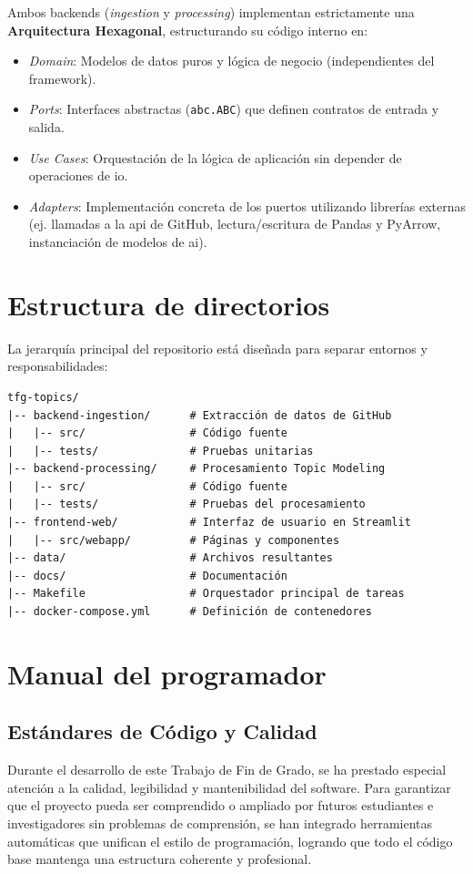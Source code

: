 Ambos backends (\textit{ingestion} y \textit{processing}) implementan
estrictamente una \textbf{Arquitectura Hexagonal}, estructurando su código
interno en:
\begin{itemize}
    \item \textit{Domain}: Modelos de datos puros y lógica de negocio (independientes del framework).
    \item \textit{Ports}: Interfaces abstractas (\texttt{abc.ABC}) que definen contratos de entrada y salida.
    \item \textit{Use Cases}: Orquestación de la lógica de aplicación sin depender de operaciones de \acrshort{io}.
    \item \textit{Adapters}: Implementación concreta de los puertos utilizando librerías externas (ej. llamadas a la \acrshort{api} de GitHub, lectura/escritura de Pandas y PyArrow, instanciación de modelos de \acrshort{ai}).
\end{itemize}

\section{Estructura de directorios}
La jerarquía principal del repositorio está diseñada para separar entornos y
responsabilidades:

\begin{verbatim}
tfg-topics/
|-- backend-ingestion/      # Extracción de datos de GitHub
|   |-- src/                # Código fuente
|   |-- tests/              # Pruebas unitarias
|-- backend-processing/     # Procesamiento Topic Modeling
|   |-- src/                # Código fuente
|   |-- tests/              # Pruebas del procesamiento
|-- frontend-web/           # Interfaz de usuario en Streamlit
|   |-- src/webapp/         # Páginas y componentes
|-- data/                   # Archivos resultantes
|-- docs/                   # Documentación
|-- Makefile                # Orquestador principal de tareas
|-- docker-compose.yml      # Definición de contenedores
\end{verbatim}

\section{Manual del programador}

\subsection{Estándares de Código y Calidad}
Durante el desarrollo de este Trabajo de Fin de Grado, se ha prestado especial
atención a la calidad, legibilidad y mantenibilidad del software. Para
garantizar que el proyecto pueda ser comprendido o ampliado por futuros
estudiantes e investigadores sin problemas de comprensión, se han integrado
herramientas automáticas que unifican el estilo de programación, logrando que
todo el código base mantenga una estructura coherente y profesional.

